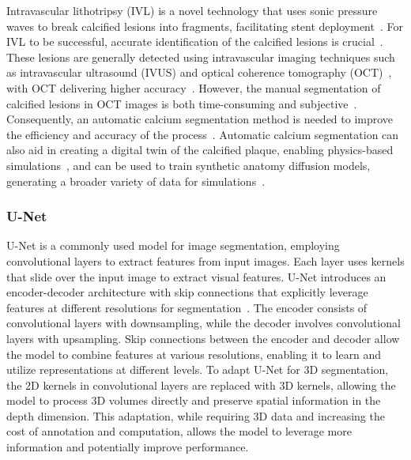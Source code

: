 \documentclass[a4paper,11pt,oneside]{report}
\begin{document}
Intravascular lithotripsy (IVL) is a novel technology that uses sonic pressure waves to break calcified lesions into fragments, facilitating stent deployment~\cite{Butt2023}. For IVL to be successful, accurate identification of the calcified lesions is crucial~\cite{Butt2023}. These lesions are generally detected using intravascular imaging techniques such as intravascular ultrasound (IVUS) and optical coherence tomography (OCT)~\cite{Butt2023}, with OCT delivering higher accuracy~\cite{Fujimoto2003, Costopoulos2016}. However, the manual segmentation of calcified lesions in OCT images is both time-consuming and subjective~\cite{Segars2013, Oktay2020, Carpenter2022}. Consequently, an automatic calcium segmentation method is needed to improve the efficiency and accuracy of the process~\cite{Carpenter2022}. Automatic calcium segmentation can also aid in creating a digital twin of the calcified plaque, enabling physics-based simulations~\cite{Karanasiou2020, Poletti2022}, and can be used to train synthetic anatomy diffusion models, generating a broader variety of data for simulations~\cite{Kadry2024}.

\subsubsection{U-Net}
U-Net is a commonly used model for image segmentation, employing convolutional layers to extract features from input images. Each layer uses kernels that slide over the input image to extract visual features. U-Net introduces an encoder-decoder architecture with skip connections that explicitly leverage features at different resolutions for segmentation~\cite{Ronneberger2015}. The encoder consists of convolutional layers with downsampling, while the decoder involves convolutional layers with upsampling. Skip connections between the encoder and decoder allow the model to combine features at various resolutions, enabling it to learn and utilize representations at different levels. To adapt U-Net for 3D segmentation, the 2D kernels in convolutional layers are replaced with 3D kernels, allowing the model to process 3D volumes directly and preserve spatial information in the depth dimension. This adaptation, while requiring 3D data and increasing the cost of annotation and computation, allows the model to leverage more information and potentially improve performance.
\end{document}
